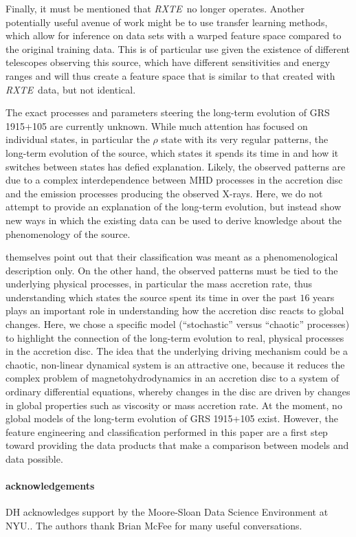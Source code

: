 \documentclass[12pt]{emulateapj}
\newcommand{\project}[1]{\textsl{#1}}
\newcommand{\rxte}{\project{RXTE}}
\begin{document}
Finally, it must be mentioned that \rxte\ no longer operates. Another potentially useful avenue of work might be to use transfer learning methods, which allow 
for inference on data sets with a warped feature space compared to the original training data. This is of particular use given the existence of different telescopes 
observing this source, which have different sensitivities and energy ranges and will thus create a feature space that is similar to that created with \rxte\ data, but 
not identical.

The exact processes and parameters steering the long-term evolution of GRS 1915+105 are currently unknown. While much attention has focused on 
individual states, in particular the $\rho$ state with its very regular patterns, the long-term evolution of the source, which states it spends its time in and how 
it switches between states has defied explanation. Likely, the observed patterns are due to a complex interdependence between MHD processes in the accretion 
disc and the emission processes producing the observed X-rays. Here, we do not attempt to provide an explanation of the long-term evolution, but instead show 
new ways in which the existing data can be used to derive knowledge about the phenomenology of the source. 

\citet{belloni2000} themselves point out that their classification was meant as a phenomenological description only. On the other hand, the observed patterns 
must be tied to the underlying physical processes, in particular the mass accretion rate, thus understanding which states the source spent its time in over the 
past $16$ years plays an important role in understanding how the accretion disc reacts to global changes. Here, we chose a specific model (``stochastic'' versus 
``chaotic'' processes) to highlight the connection of the long-term evolution to real, physical processes in the accretion disc. The idea that the underlying driving 
mechanism could be a chaotic, non-linear dynamical system is an attractive one, because it reduces the complex problem of magnetohydrodynamics in an 
accretion disc to a system of ordinary differential equations, whereby changes in the disc are driven by changes in global properties such as viscosity or mass 
accretion rate. At the moment, no global models of the long-term evolution of GRS 1915+105 exist. However, the feature engineering and classification performed in this paper are a first step toward providing the data products that make a comparison between models and data possible.

\paragraph{acknowledgements}
DH acknowledges support by the Moore-Sloan Data Science Environment at NYU.. The authors thank Brian McFee for many useful conversations.

\end{document}
